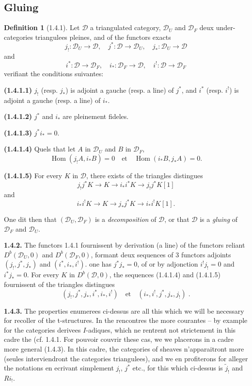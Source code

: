 \documentclass[12pt,a4paper]{article}
\theoremstyle{plain}
\theoremstyle{definition}
\newtheorem{definition}[theorem]{Definition}
\theoremstyle{remark}
\DeclareMathOperator{\Hom}{Hom}
\newcommand{\cD}{\mathcal{D}}
\begin{document}
\subsection{Gluing}

\begin{definition}[1.4.1]
Let $\cD$ a triangulated category, $\cD_{U}$ and $\cD_{F}$ deux under-categories triangulees pleines, and of the functors exacts
\[
j_{!} : \cD_{U} \to \cD, \quad j^{*} : \cD \to \cD_{U}, \quad j_{*} : \cD_{U} \to \cD
\]
and
\[
i^{*} : \cD \to \cD_{F}, \quad i_{*} : \cD_{F} \to \cD, \quad i^{!} : \cD \to \cD_{F}
\]
verifiant the conditions suivantes:

\smallskip

\noindent
\textbf{(1.4.1.1)} $j_{!}$ (resp. $j_{*}$) is adjoint a gauche (resp. a line) of $j^{*}$, and $i^{*}$ (resp. $i^{!}$) is adjoint a gauche (resp. a line) of $i_{*}$.

\noindent
\textbf{(1.4.1.2)} $j^{*}$ and $i_{*}$ are pleinement fideles.

\noindent
\textbf{(1.4.1.3)} $j^{*}i_{*} = 0$.

\noindent
\textbf{(1.4.1.4)} Quels that let $A$ in $\cD_{U}$ and $B$ in $\cD_{F}$,
\[
\Hom(j_{!}A, i_{*}B) = 0 \quad \text{et} \quad \Hom(i_{*}B, j_{*}A) = 0.
\]

\noindent
\textbf{(1.4.1.5)} For every $K$ in $\cD$, there exists of the triangles distingues
\[
j_{!}j^{*}K \to K \to i_{*}i^{*}K \to j_{!}j^{*}K[1]
\]
and
\[
i_{*}i^{!}K \to K \to j_{*}j^{*}K \to i_{*}i^{!}K[1].
\]
\end{definition}

One dit then that $(\cD_{U}, \cD_{F})$ is a \emph{decomposition} of $\cD$, or that $\cD$ is a \emph{gluing} of $\cD_{F}$ and $\cD_{U}$.

\smallskip

\noindent
\textbf{1.4.2.} The functors 1.4.1 fournissent by derivation (a line) of the functors reliant $D^{b}(\cD_{U}, 0)$ and $D^{b}(\cD_{F}, 0)$, formant deux sequences of $3$ functors adjoints $(j_{!}, j^{*}, j_{*})$ and $(i^{*}, i_{*}, i^{!})$. one has $j^{*}j_{*} = 0$, of or by adjonction $i^{!}j_{!} = 0$ and $i^{*}j_{*} = 0$. For every $K$ in $D^{b}(\cD, 0)$, the sequences (1.4.1.4) and (1.4.1.5) fournissent of the triangles distingues
\[
(j_{!}, j^{*}, j_{*}, i^{*}, i_{*}, i^{!}) \quad \text{et} \quad (i_{*}, i^{!}, j^{*}, j_{*}, j_{!})\;.
\]

\smallskip

\noindent
\textbf{1.4.3.} The properties enumerees ci-dessus are all this which we will be necessary for recoller of the t-structures. In the rencontres the more courantes -- by example for the categories derivees $
I$-adiques, which ne rentrent not strictement in this cadre the (cf. 1.4.1. For pouvoir couvrir these cas, we we placerons in a cadre more general (1.4.3). In this cadre, the categories of sheaves n'apparaitront more (seules interviendront the categories triangulees), and we en profiterons for alleger the notations en ecrivant simplement $j_{!}$, $j^{*}$ etc., for this which ci-dessus is $\tilde{j}_{!}$ and $Ri_{!}$.
\end{document}
